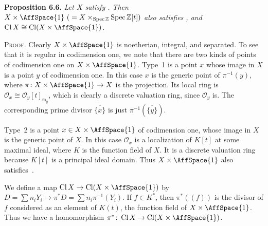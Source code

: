 {\medskip
\noindent\hypertarget{result-II-6.6}{}\textbf{Proposition 6.6.} \emph{Let $X$ satisfy . Then $X\times\AffSpace{1}\ ({}=X\times_{\operatorname{Spec}\mathbb Z}\operatorname{Spec}\mathbb Z[t])$ also satisfies , and $\operatorname{Cl} X\cong\operatorname{Cl}(X\times\AffSpace{1})$.}

\smallskip
\noindent\textsc{Proof.} Clearly $X\times\AffSpace{1}$ is noetherian, integral, and separated. To see that it is regular in codimension one, we note that there are two kinds of points of codimension one on $X\times\AffSpace{1}$. \hypertarget{type-II-6.6-1}{}Type~1 is a point $x$ whose image in $X$ is a point $y$ of codimension one. In this case $x$ is the generic point of $\pi^{-1}(y)$, where $\pi\colon X\times\AffSpace{1}\to X$ is the projection. Its local ring is $\mathcal O_x\cong\mathcal O_y[t]_{\mathfrak m_y}$, which is clearly a discrete valuation ring, since $\mathcal O_y$ is. The corresponding prime divisor $\overline{\{x\}}$ is just $\pi^{-1}(\overline{\{y\}})$.

\hypertarget{type-II-6.6-2}{}Type~2 is a point $x\in X\times\AffSpace{1}$ of codimension one, whose image in $X$ is the generic point of $X$. In this case $\mathcal O_x$ is a localization of $K[t]$ at some maximal ideal, where $K$ is the function field of $X$. It is a discrete valuation ring because $K[t]$ is a principal ideal domain. Thus $X\times\AffSpace{1}$ also satisfies~.

We define a map $\operatorname{Cl} X\to\operatorname{Cl}(X\times\AffSpace{1})$ by $D=\sum n_iY_i\mapsto\pi^*D=\sum n_i\pi^{-1}(Y_i)$. If $f\in K^*$, then $\pi^*((f))$ is the divisor of $f$ considered as an element of $K(t)$, the function field of $X\times\AffSpace{1}$. Thus we have a homomorphism $\pi^*\colon\operatorname{Cl} X\to\operatorname{Cl}(X\times\AffSpace{1})$.}

